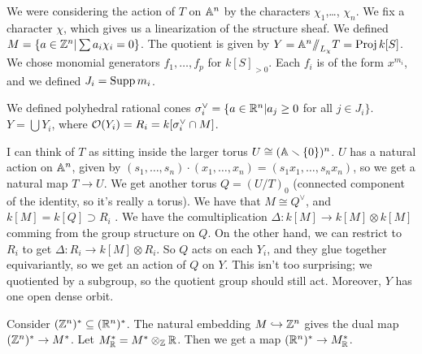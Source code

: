 
We were considering the action of $T$ on $\AA^n$ by the characters $\chi_1$,\dots, $\chi_n$. We fix a character $\chi$, which gives us a linearization of the structure sheaf. We defined $M=\{a\in \ZZ^n| \sum a_i\chi_i=0\}$. The quotient is given by $Y=\AA^n\quot_{L_\chi}T = \proj k[S]$. We chose monomial generators $f_1,\dots, f_p$ for $k[S]_{>0}$. Each $f_i$ is of the form $x^{m_i}$, and we defined $J_i=\supp m_i$.

We defined polyhedral rational cones $\sigma_i^\vee = \{a\in \RR^n|a_j\ge 0$ for all $j\in J_i\}$. $Y=\bigcup Y_i$, where $\O(Y_i)=R_i=k[\sigma_i^\vee\cap M]$.

I can think of $T$ as sitting inside the larger torus $U\cong (\AA\setminus \{0\})^n$. $U$ has a natural action on $\AA^n$, given by $(s_1,\dots, s_n)\cdot (x_1,\dots, x_n)=(s_1x_1,\dots, s_nx_n)$, so we get a natural map $T\to U$. We get another torus $Q=(U/T)_0$ (connected component of the identity, so it's really a torus). We have that $M\cong Q^\vee$, and $k[M]=k[Q]\supset R_i$ . We have the comultiplication $\Delta\colon k[M]\to k[M]\otimes k[M]$ comming from the group structure on $Q$. On the other hand, we can restrict to $R_i$ to get $\Delta\colon R_i\to k[M]\otimes R_i$. So $Q$ acts on each $Y_i$, and they glue together equivariantly, so we get an action of $Q$ on $Y$. This isn't too surprising; we quotiented by a subgroup, so the quotient group should still act. Moreover, $Y$ has one open dense orbit.

Consider $(\ZZ^n)^*\subseteq (\RR^n)^*$. The natural embedding $M\hookrightarrow \ZZ^n$ gives the dual map $(\ZZ^n)^*\to M^*$. Let $M^*_\RR=M^*\otimes_\ZZ \RR$. Then we get a map $(\RR^n)^*\to M^*_\RR$.

